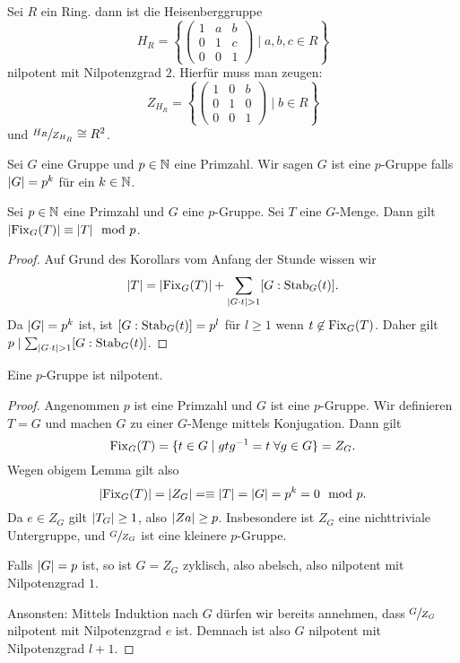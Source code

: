 \begin{eg}
	Sei $R$ ein Ring. dann ist die Heisenberggruppe
	\[
	H_{R} = \left\{ \begin{pmatrix} 
			1 & a & b\\ 0 & 1 & c\\ 0 & 0 & 1
	\end{pmatrix} \mid a,b,c \in R \right\} 
	\] 
	nilpotent mit Nilpotenzgrad $2$.
	Hierfür muss man zeugen:
	\[
	Z_{H_{R}} = \left\{ \begin{pmatrix} 
			1 & 0 & b\\ 0 & 1 & 0\\ 0 & 0 &1
	\end{pmatrix} \mid b \in R \right\} 
	\] 
	und $\sfrac{H_{R}}{Z_{H_{R}}} \cong R^2$.
\end{eg}

\begin{definition}
	Sei $G$ eine Gruppe und $p \in \mathbb{N}$ eine Primzahl.
	Wir sagen $G$ ist eine $p$-Gruppe falls $\abs{G} = p^{k}$ für ein $k \in \mathbb{N}$.
\end{definition}

\begin{lemma}
	Sei $p \in \mathbb{N}$ eine Primzahl und $G$ eine $p$-Gruppe.
	Sei $T$ eine $G$-Menge. Dann gilt $\abs{\operatorname{Fix}_{G}(T)} \equiv \abs{T} \mod p$.
\end{lemma}

\begin{proof}
	Auf Grund des Korollars vom Anfang der Stunde wissen wir
	\[
		\abs{T} = \abs{\operatorname{Fix}_{G}(T)} + \sum_{\abs{G \cdot t} > 1} [G : \operatorname{Stab}_{G}(t)]
	.\] 
	Da $\abs{G} = p^{k}$ ist, ist $[ G : \operatorname{Stab}_{G}(t) ] = p^{l}$ für $l \geq 1$ wenn $t \not\in \operatorname{Fix}_{G}(T)$.
	Daher gilt $p \mid \sum_{\abs{G \cdot t} > 1} [G : \operatorname{Stab}_{G}(t)]$.
\end{proof}

\begin{theorem}
	Eine $p$-Gruppe ist nilpotent.
\end{theorem}

\begin{proof}
	Angenommen $p$ ist eine Primzahl und $G$ ist eine $p$-Gruppe.
	Wir definieren $T = G$ und machen $G$ zu einer $G$-Menge mittels Konjugation. Dann gilt
	\[
		\on{Fix}_{G}(T) = \{t \in G \mid g t g^{-1} = t \forall g \in G\} = Z_{G}
	.\] 
	Wegen obigem Lemma gilt also
	\[
		\abs{\operatorname{Fix}_{G}(T)} = \abs{Z_{G}} = \equiv \abs{T} = \abs{G} = p^{k} = 0 \mod p
	.\] 
	Da $e \in Z_{G}$ gilt $\abs{T_{G}} \geq 1$, also $\abs{Za} \geq p$.
	Insbesondere ist $Z_{G}$ eine nichttriviale Untergruppe, und
	$\sfrac{G}{Z_{G}}$ ist eine kleinere $p$-Gruppe.

	Falls $\abs{G} = p$ ist, so ist $G = Z_{G}$ zyklisch, also abelsch, also nilpotent mit Nilpotenzgrad $1$.
	
	Ansonsten:
	Mittels Induktion nach  $G$ dürfen wir bereits annehmen, dass $\sfrac{G}{Z_{G}}$ nilpotent mit Nilpotenzgrad $e$ ist.
	Demnach ist also $G$ nilpotent mit Nilpotenzgrad $l+1$.
\end{proof}

